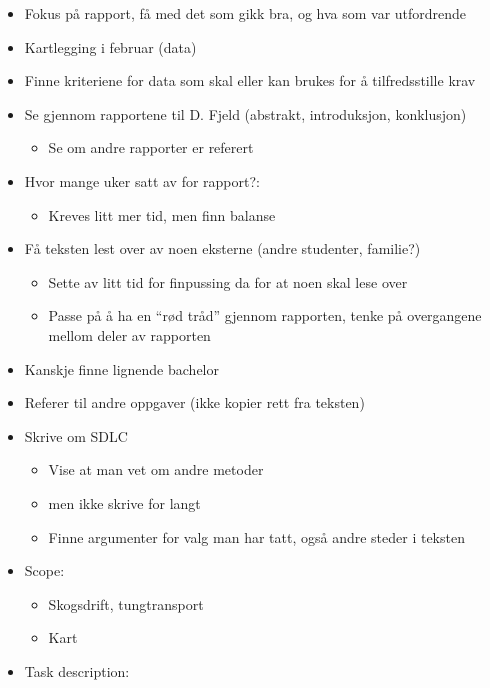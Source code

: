 \begin{itemize}
\item
  Fokus på rapport, få med det som gikk bra, og hva som var utfordrende
\item
  Kartlegging i februar (data)
\item
  Finne kriteriene for data som skal eller kan brukes for å
  tilfredsstille krav
\item
  Se gjennom rapportene til D. Fjeld (abstrakt, introduksjon,
  konklusjon)

  \begin{itemize}
  \item
    Se om andre rapporter er referert
  \end{itemize}
\item
  Hvor mange uker satt av for rapport?:

  \begin{itemize}
  \item
    Kreves litt mer tid, men finn balanse
  \end{itemize}
\item
  Få teksten lest over av noen eksterne (andre studenter, familie?)

  \begin{itemize}
  \item
    Sette av litt tid for finpussing da for at noen skal lese over
  \item
    Passe på å ha en ``rød tråd'' gjennom rapporten, tenke på
    overgangene mellom deler av rapporten
  \end{itemize}
\item
  Kanskje finne lignende bachelor
\item
  Referer til andre oppgaver (ikke kopier rett fra teksten)
\item
  Skrive om SDLC

  \begin{itemize}
  \item
    Vise at man vet om andre metoder
  \item
    men ikke skrive for langt
  \item
    Finne argumenter for valg man har tatt, også andre steder i teksten
  \end{itemize}
\item
  Scope:

  \begin{itemize}
  \item
    Skogsdrift, tungtransport
  \item
    Kart
  \end{itemize}
\item
  Task description:


\end{itemize}
